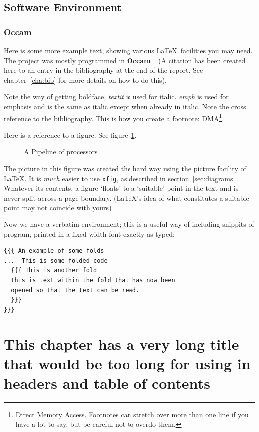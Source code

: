 \section{Software Environment}
\subsection{Occam}

Here is some more example text, showing various \LaTeX\ facilities
you may need.  The project was mostly programmed in
\textbf{Occam}~\cite{occam}.  (A citation has been created  here to an
entry in the bibliography at the end of the report. See
chapter~\ref{cha:bib} for more details on how to do this).

Note the way of getting boldface, \textit{textit} is used for italic.
\emph{emph} is used for emphasis and is the same as italic except when
already in italic.  Note the cross reference to the bibliography.
This is how you create a footnote: DMA\footnote{Direct Memory Access.
  Footnotes can stretch over more than one line if you have a lot to
  say, but be careful not to overdo them.}.

Here is a reference to a figure. See figure~\ref{pipeline}.
\begin{figure}[htbp]
  \centering
  
  \caption{A Pipeline of processors}\label{pipeline}
\end{figure}
The picture in this figure was created the hard way using the picture
facility of \LaTeX. It is \emph{much} easier to use \texttt{xfig}, as
described in section~\ref{sec:diagrams}.  Whatever its contents, a
figure `floats' to a `suitable' point in the text and is never split
across a page boundary. (\LaTeX's idea of what constitutes a suitable
point may not coincide with yours)


Now we have a verbatim environment; this is a useful way of including
snippits of program, printed in a fixed width font exactly as typed:

\begin{verbatim}
{{{ An example of some folds
...  This is some folded code
  {{{ This is another fold
  This is text within the fold that has now been
  opened so that the text can be read.
  }}}
}}}
\end{verbatim}

\chapter[Short Chap title]{This chapter has a very long title that would be too long for using in headers and table of contents}
